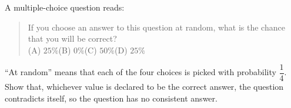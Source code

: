 A multiple-choice question reads:
\begin{quote}
If you choose an answer to this question at random, what is the chance that you will be correct?\\
(A) $25\%$\qquad (B) $0\%$\qquad (C) $50\%$\qquad (D) $25\%$
\end{quote}
``At random'' means that each of the four choices is picked with probability $\dfrac{1}{4}$. Show that, whichever value is declared to be the correct answer, the question contradicts itself, so the question has no consistent answer.
